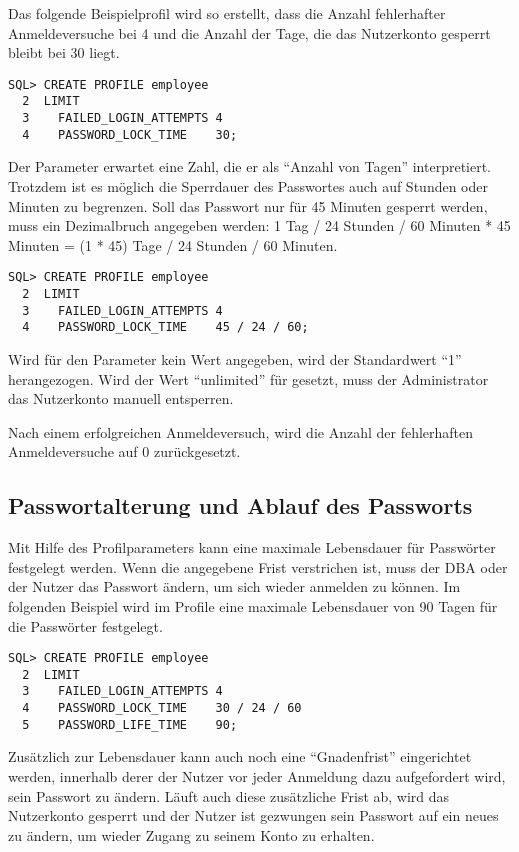         Das folgende Beispielprofil wird so erstellt, dass die Anzahl fehlerhafter Anmeldeversuche bei 4 und die Anzahl der Tage, die das Nutzerkonto gesperrt bleibt bei 30 liegt.
        \begin{lstlisting}[caption={Anzahl fehlerhafter Anmeldeversuche
        konfigurieren und das Passwort 30 Tage sperren},label=admin217,language=oracle_sql]
SQL> CREATE PROFILE employee
  2  LIMIT
  3    FAILED_LOGIN_ATTEMPTS 4
  4    PASSWORD_LOCK_TIME    30;
        \end{lstlisting}
        Der Parameter  erwartet eine Zahl, die er als \enquote{Anzahl von Tagen} interpretiert. Trotzdem ist es m\"oglich die Sperrdauer des Passwortes auch auf Stunden oder Minuten zu begrenzen. Soll das Passwort nur f\"ur 45 Minuten gesperrt werden, muss ein Dezimalbruch angegeben werden: 1 Tag / 24 Stunden / 60 Minuten * 45 Minuten = (1 * 45) Tage / 24 Stunden / 60 Minuten.
        \begin{lstlisting}[caption={Anzahl fehlerhafter Anmeldeversuche
        konfigurieren und das Passwort 45 Minuten sperren},label=admin218,language=oracle_sql]
SQL> CREATE PROFILE employee
  2  LIMIT
  3    FAILED_LOGIN_ATTEMPTS 4
  4    PASSWORD_LOCK_TIME    45 / 24 / 60;
        \end{lstlisting}
        \begin{merke}
          Wird f\"ur den Parameter  kein Wert angegeben, wird der Standardwert \enquote{1} herangezogen. Wird der Wert \enquote{unlimited} f\"ur  gesetzt, muss der Administrator das Nutzerkonto manuell
          entsperren.
        \end{merke}
        Nach einem erfolgreichen Anmeldeversuch, wird die Anzahl der fehlerhaften Anmeldeversuche auf 0 zur\"uckgesetzt.
      \subsection{Passwortalterung und Ablauf des Passworts}
        Mit Hilfe des Profilparameters  kann eine maximale Lebensdauer f\"ur Pass\-w\"or\-ter festgelegt werden. Wenn die angegebene Frist verstrichen ist, muss der DBA oder der Nutzer das Passwort \"andern, um sich wieder anmelden zu k\"onnen. Im folgenden Beispiel wird im Profile  eine maximale Lebensdauer von 90 Tagen f\"ur die Passw\"orter festgelegt.
        \begin{lstlisting}[caption={Passwortlebensdauer},label=admin219,language=oracle_sql]
SQL> CREATE PROFILE employee
  2  LIMIT
  3    FAILED_LOGIN_ATTEMPTS 4
  4    PASSWORD_LOCK_TIME    30 / 24 / 60
  5    PASSWORD_LIFE_TIME    90;
        \end{lstlisting}
        Zus\"atzlich zur Lebensdauer kann auch noch eine \enquote{Gnadenfrist} eingerichtet werden, innerhalb derer der Nutzer vor jeder Anmeldung dazu aufgefordert wird, sein Passwort zu \"andern. L\"auft auch diese zus\"atzliche Frist ab, wird das Nutzerkonto gesperrt und der Nutzer ist gezwungen sein Passwort auf ein neues zu \"andern, um wieder Zugang zu seinem Konto zu erhalten.

